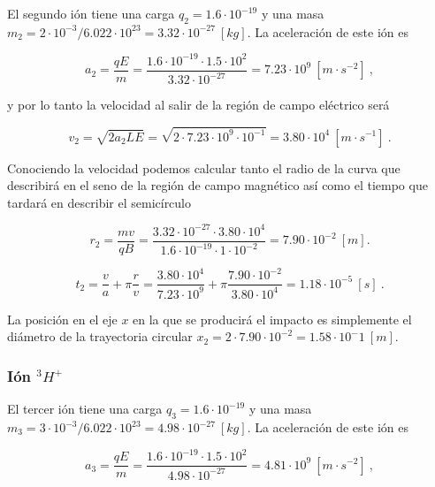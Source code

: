 \documentclass[journal]{IEEEtran}
\begin{document}
El segundo ión tiene una carga $q_2 = 1.6\cdot 10^{-19}$ y una masa $m_2 = 2\cdot 10^{-3} / 6.022\cdot 10^{23} = 3.32\cdot 10^{-27}~[kg]$. La aceleración de este ión es

\begin{equation}
a_2 = \displaystyle\frac{qE}{m} = \displaystyle\frac{1.6\cdot 10^{-19}\cdot 1.5\cdot 10^{2}}{3.32\cdot 10^{-27}} = 7.23 \cdot 10^{9}~[m\cdot s^{-2}]~,
\end{equation}

y por lo tanto la velocidad al salir de la región de campo eléctrico será

\begin{equation}
v_2 = \sqrt{2a_2LE} = \sqrt{2\cdot 7.23 \cdot 10^{9} \cdot 10^{-1}} = 3.80 \cdot 10^4~[m\cdot s^{-1}]~.
\end{equation}

Conociendo la velocidad podemos calcular tanto el radio de la curva que describirá en el seno de la región de campo magnético así como el tiempo que tardará en describir el semicírculo

\begin{equation}
r_2 = \displaystyle\frac{mv}{qB} = \displaystyle\frac{3.32\cdot 10^{-27} \cdot 3.80\cdot 10^4}{1.6\cdot 10^{-19}\cdot 1 \cdot 10^{-2}} = 7.90\cdot 10^{-2}~[m].
\end{equation}

\begin{equation}
t_2 = \displaystyle\frac{v}{a} + \pi \displaystyle\frac{r}{v} = \displaystyle\frac{3.80 \cdot 10^4}{7.23 \cdot 10^{9}} + \pi \displaystyle\frac{7.90 \cdot 10^{-2}}{3.80 \cdot 10^4} = 1.18 \cdot 10^{-5}~[s]~.
\end{equation}

La posición en el eje $x$ en la que se producirá el impacto es simplemente el diámetro de la trayectoria circular $x_2 = 2\cdot7.90 \cdot 10^{-2} = 1.58 \cdot 10^-1~[m]$.

\subsubsection{Ión $^3H^+$}

El tercer ión tiene una carga $q_3 = 1.6\cdot 10^{-19}$ y una masa $m_3 = 3\cdot 10^{-3} / 6.022\cdot 10^{23} = 4.98\cdot 10^{-27}~[kg]$. La aceleración de este ión es

\begin{equation}
a_3 = \displaystyle\frac{qE}{m} = \displaystyle\frac{1.6\cdot 10^{-19}\cdot 1.5\cdot 10^{2}}{4.98\cdot 10^{-27}} = 4.81 \cdot 10^{9}~[m\cdot s^{-2}]~,
\end{equation}
\end{document}
